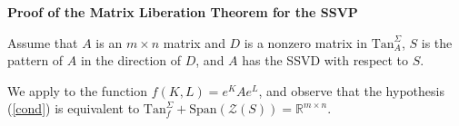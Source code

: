 \documentclass[preprint,12pt]{elsarticle}
\begin{document}
\noindent
{\bf Proof of the Matrix Liberation Theorem for the SSVP}

Assume that $A$ is an $m\times n$ matrix and 
$D$ is a nonzero matrix in $\mbox{Tan}_A^{\Sigma}$, $S$ is the pattern of $A$ in the direction of $D$, and $A$ has the SSVD with respect to $S$. 

We apply  to the function $f(K,L)=e^KAe^L$, and observe that the hypothesis 
(\ref{cond}) is equivalent to $\mbox{Tan}_f^{\Sigma} + \mbox{Span}(\mathcal{Z}(S))= \mathbb{R}^{m\times n}$.











 

\end{document}
